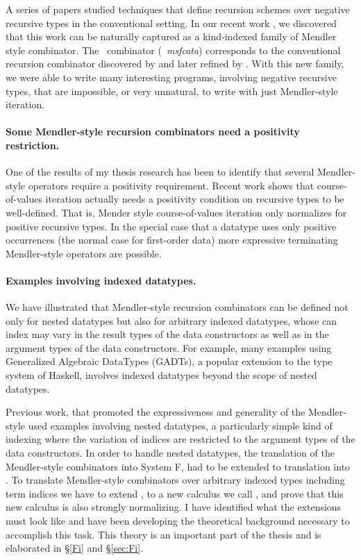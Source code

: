 A series of papers \cite{Pat93,MeiHut95,FegShe96,DesPfeSch97,bgb} studied 
techniques that define recursion schemes over negative recursive types in
the conventional setting. In our recent work \cite{AhnShe11}, we discovered
that this work can be naturally captured as a kind-indexed family of Mendler
style combinator. The \MsfIt\ combinator (\aka\ \textit{msfcata}) corresponds to
the conventional recursion combinator discovered by \citet{FegShe96} and
later refined by \citet{bgb}. With this new family, we were able to write many
interesting programs, involving negative recursive types, that are impossible,
or very unnatural, to write with just Mendler-style iteration.

\paragraph{Some Mendler-style recursion combinators need
           a positivity restriction.}
One of the results of my thesis research has been to identify that several
Mendler-style operators require a positivity requirement. 
Recent work \cite{AhnShe11} shows that course-of-values iteration
\cite{vene00phd,UusVen02} actually needs a positivity condition on
recursive types to be well-defined. That is, Mender style course-of-values
iteration only normalizes for positive recursive types. In the special case
that a datatype uses only positive occurrences (the normal case for first-order
data) more expressive terminating Mendler-style operators are possible.

\paragraph{Examples involving indexed datatypes.} 
We \cite{AhnShe11} have illustrated that Mendler-style recursion combinators
can be defined not only for nested datatypes but also for arbitrary indexed
datatypes, whose can index may vary in the result types of the
data constructors as well as in the argument types of the data constructors.
For example, many examples using Generalized Algebraic DataTypes (GADTs),
a popular extension to the type system of Haskell, involves indexed datatypes
beyond the scope of nested datatypes.

Previous work, that promoted the expressiveness and generality of
the Mendler-style \cite{AbeMatUus03,AbeMatUus05,AbeMat04} used examples
involving nested datatypes, a particularly simple kind of indexing
where the variation of indices are restricted to the argument types of
the data constructors. In order to handle nested datatypes, the translation of
the Mendler-style combinators into System \textsf{F}, had to be extended to
translation into \Fw. To translate Mendler-style combinators over arbitrary
indexed types including term indices we have to extend \Fw, to a new calculus
we call \Fi, and prove that this new calculus is also strongly normalizing.
I have identified what the extensions must look like and have been developing
the theoretical background necessary to accomplish this task.
This theory is an important part of the thesis and is elaborated in
\S\ref{Fi} and \S\ref{sec:Fi}.

